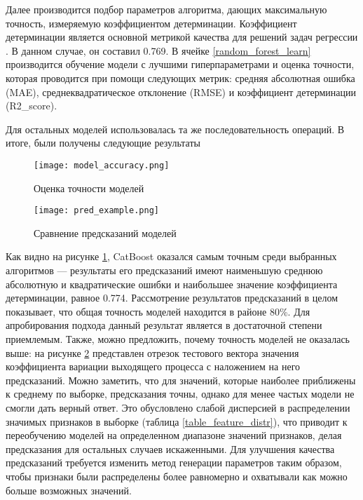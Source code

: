 Далее производится подбор параметров алгоритма, дающих максимальную точность, измеряемую коэффициентом детерминации. Коэффициент детерминации является основной метрикой качества для решений задач регрессии \cite{gomar2011validation}. В данном случае, он составил 0.769.
В ячейке \ref{random_forest_learn} производится обучение модели с лучшими гиперпараметрами и оценка точности, которая проводится при помощи следующих метрик:  средняя абсолютная ошибка (MAE), среднеквадратическое отклонение (RMSE) и коэффициент детерминации (R2\_score).

Для остальных моделей использовалась та же последовательность операций. В итоге, были получены следующие результаты
\begin{figure}[H]
	\centering
	\texttt{[image: model\_accuracy.png]}
	\caption{Оценка точности моделей}
	\label{model_accuracy}
\end{figure}
\begin{figure}[H]
	\centering
	\texttt{[image: pred\_example.png]}
	\caption{Сравнение предсказаний моделей}
	\label{pred_example}
\end{figure}
Как видно на рисунке \ref{model_accuracy}, CatBoost оказался самым точным среди выбранных алгоритмов --- результаты его предсказаний имеют наименьшую среднюю абсолютную и квадратические ошибки и наибольшее значение коэффициента детерминации, равное 0.774. Рассмотрение результатов предсказаний в целом показывает, что общая точность моделей находится в районе 80\%. Для апробирования подхода данный результат является в достаточной степени приемлемым. Также, можно предложить, почему точность моделей не оказалась выше: на рисунке \ref{pred_example} представлен отрезок тестового вектора значения коэффициента вариации выходящего процесса с наложением на него предсказаний. Можно заметить, что для значений, которые наиболее приближены к среднему по выборке, предсказания точны, однако для менее частых модели не смогли дать верный ответ. Это обусловлено слабой дисперсией в распределении значимых признаков в выборке (таблица \ref{table_feature_distr}), что приводит к переобучению моделей на определенном диапазоне значений признаков, делая предсказания для остальных случаев искаженными. Для улучшения качества предсказаний требуется изменить метод генерации параметров таким образом, чтобы признаки были распределены более равномерно и охватывали как можно больше возможных значений.
\clearpage